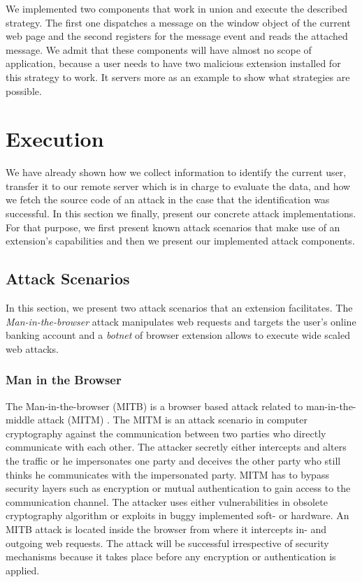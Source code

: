 	We implemented two components that work in union and execute the described strategy. The first one dispatches a message on the window object of the current web page and the second registers for the message event and reads the attached message. We admit that these components will have almost no scope of application, because a user needs to have two malicious extension installed for this strategy to work. It servers more as an example to show what strategies are possible.


\clearpage
\section{Execution}
\label{sec:execution}

	We have already shown how we collect information to identify the current user, transfer it to our remote server which is in charge to evaluate the data, and how we fetch the source code of an attack in the case that the identification was successful. In this section we finally, present our concrete attack implementations. For that purpose, we first present known attack scenarios that make use of an extension's capabilities and then we present our implemented attack components.
	
\subsection{Attack Scenarios}

	In this section, we present two attack scenarios that an extension facilitates. The \textit{Man-in-the-browser} attack manipulates web requests and targets the user's online banking account and a \textit{botnet} of browser extension allows to execute wide scaled web attacks.

\subsubsection{Man in the Browser}
	
	The Man-in-the-browser (MITB) is a browser based attack related to man-in-the-middle attack (MITM) \cite{Curran:2012:MBA:2433195.2433198}. The MITM is an attack scenario in computer cryptography against the communication between two parties who directly communicate with each other. The attacker secretly either intercepts and alters the traffic or he impersonates one party and deceives the other party who still thinks he communicates with the impersonated party. MITM has to bypass security layers such as encryption or mutual authentication to gain access to the communication channel. The attacker uses either vulnerabilities in obsolete cryptography algorithm or exploits in buggy implemented soft- or hardware. An MITB attack is located inside the browser from where it intercepts in- and outgoing web requests. The attack will be successful irrespective of security mechanisms because it takes place before any encryption or authentication is applied. 
	
